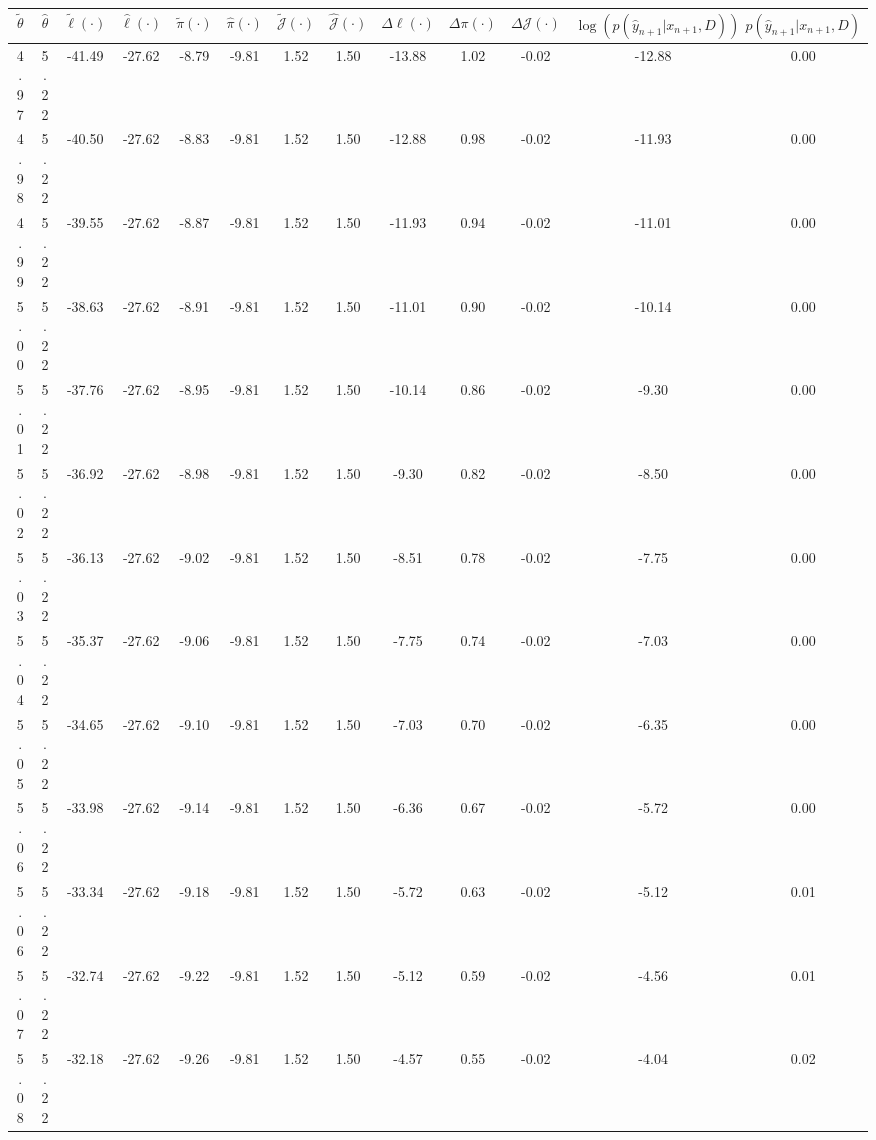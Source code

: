 \begin{table}[htbp]
        \centering
        \tiny
        \begin{adjustbox}{angle=90}
            \begin{tabular}{|c|c|c|c|c|c|c|c|c|c|c|c|c|}
                \hline
                 $\tilde{\theta}$ & $\hat{\theta}$ & $\tilde{\ell}(\cdot)$ & $\hat{\ell}(\cdot)$ & $\tilde{\pi}(\cdot)$ & $\hat{\pi}(\cdot)$ & $\tilde{\mathcal{J}}(\cdot)$ & $\hat{\mathcal{J}}(\cdot)$ & $\Delta \ell(\cdot)$ & $\Delta \pi(\cdot)$ & $\Delta \mathcal{J}(\cdot)$ & $\log(p(\hat{y}_{n+1}|x_{n+1}, D))$ & $p(\hat{y}_{n+1}|x_{n+1}, D)$ \\
                \hline
                 4.97 & 5.22 & -41.49 & -27.62 & -8.79 & -9.81 & 1.52 & 1.50 & -13.88 & 1.02 & -0.02 & -12.88 & 0.00\\ \hline
 4.98 & 5.22 & -40.50 & -27.62 & -8.83 & -9.81 & 1.52 & 1.50 & -12.88 & 0.98 & -0.02 & -11.93 & 0.00\\ \hline
 4.99 & 5.22 & -39.55 & -27.62 & -8.87 & -9.81 & 1.52 & 1.50 & -11.93 & 0.94 & -0.02 & -11.01 & 0.00\\ \hline
 5.00 & 5.22 & -38.63 & -27.62 & -8.91 & -9.81 & 1.52 & 1.50 & -11.01 & 0.90 & -0.02 & -10.14 & 0.00\\ \hline
 5.01 & 5.22 & -37.76 & -27.62 & -8.95 & -9.81 & 1.52 & 1.50 & -10.14 & 0.86 & -0.02 & -9.30 & 0.00\\ \hline
 5.02 & 5.22 & -36.92 & -27.62 & -8.98 & -9.81 & 1.52 & 1.50 & -9.30 & 0.82 & -0.02 & -8.50 & 0.00\\ \hline
 5.03 & 5.22 & -36.13 & -27.62 & -9.02 & -9.81 & 1.52 & 1.50 & -8.51 & 0.78 & -0.02 & -7.75 & 0.00\\ \hline
 5.04 & 5.22 & -35.37 & -27.62 & -9.06 & -9.81 & 1.52 & 1.50 & -7.75 & 0.74 & -0.02 & -7.03 & 0.00\\ \hline
 5.05 & 5.22 & -34.65 & -27.62 & -9.10 & -9.81 & 1.52 & 1.50 & -7.03 & 0.70 & -0.02 & -6.35 & 0.00\\ \hline
 5.06 & 5.22 & -33.98 & -27.62 & -9.14 & -9.81 & 1.52 & 1.50 & -6.36 & 0.67 & -0.02 & -5.72 & 0.00\\ \hline
 5.06 & 5.22 & -33.34 & -27.62 & -9.18 & -9.81 & 1.52 & 1.50 & -5.72 & 0.63 & -0.02 & -5.12 & 0.01\\ \hline
 5.07 & 5.22 & -32.74 & -27.62 & -9.22 & -9.81 & 1.52 & 1.50 & -5.12 & 0.59 & -0.02 & -4.56 & 0.01\\ \hline
 5.08 & 5.22 & -32.18 & -27.62 & -9.26 & -9.81 & 1.52 & 1.50 & -4.57 & 0.55 & -0.02 & -4.04 & 0.02\\ \hline

\end{tabular}
\end{adjustbox}
\end{table}
